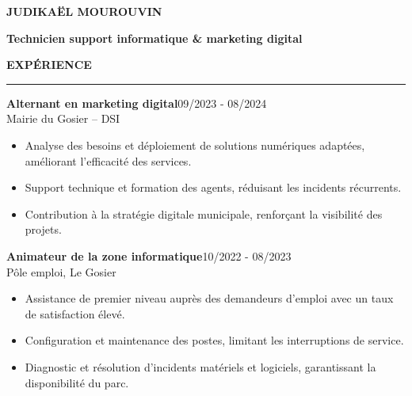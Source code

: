 \documentclass{article}
\newcommand{\cvsection}[1]{%
  \par\bigskip
  {\bfseries\Large #1}\par
  \noindent\rule{\linewidth}{0.8pt}\par\medskip}
\begin{document}
\pagestyle{empty}
\begin{paracol}{2}

{\LARGE\textbf{JUDIKAËL MOUROUVIN}}

\bigskip
{\large\textbf{Technicien support informatique \& marketing digital}}

\vspace{0.8cm}

\cvsection{EXPÉRIENCE}
\colorbox{maincolor}{%
  \begin{minipage}{\linewidth}
    \noindent
    \textbf{Alternant en marketing digital}\hfill 09/2023 - 08/2024\\
    Mairie du Gosier – DSI\\[-0.3em]
    \begin{itemize}[leftmargin=*]
      \item Analyse des besoins et déploiement de solutions numériques adaptées, améliorant l’efficacité des services. \item Support technique et formation des agents, réduisant les incidents récurrents. \item Contribution à la stratégie digitale municipale, renforçant la visibilité des projets.
    \end{itemize}
  \end{minipage}}

\vspace{3mm}

\colorbox{maincolor}{%
  \begin{minipage}{\linewidth}
    \noindent
    \textbf{Animateur de la zone informatique}\hfill 10/2022 - 08/2023\\
    Pôle emploi, Le Gosier\\[-0.3em]
    \begin{itemize}[leftmargin=*]
      \item Assistance de premier niveau auprès des demandeurs d’emploi avec un taux de satisfaction élevé. \item Configuration et maintenance des postes, limitant les interruptions de service. \item Diagnostic et résolution d’incidents matériels et logiciels, garantissant la disponibilité du parc.
    \end{itemize}
  \end{minipage}}

\vspace{3mm}


\end{paracol}
\end{document}
